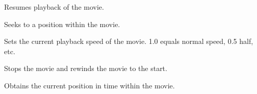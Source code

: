 
Resumes playback of the movie.


\label{wxmoviectrlseek}


Seeks to a position within the movie.


\label{wxmoviectrlsetplaybackrate}


Sets the current playback speed of the movie. 1.0 equals normal speed, 0.5 half, etc.


\label{wxmoviectrlstop}


Stops the movie and rewinds the movie to the start.


\label{wxmoviectrltell}


Obtains the current position in time within the movie.
